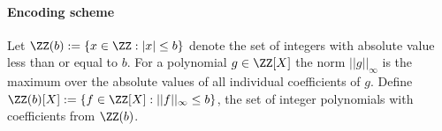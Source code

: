 \begin{comment}
Fortunately, from the value of $f'$ we can infer a \emph{probabilistic bound} on the absolute value of the $f_L$ and $f_R$ given that $\alpha \in (-p/2, p/2)$ is sampled randomly \emph{after} the prover has committed to $f_L$ and $f_R$. If $\alpha$ were not chosen randomly by the verifier no bound would apply: knowing $\alpha$, the prover can choose large $f_L$ and $f_R$ such that $\alpha f_L + f_R$ is small. The probabilistic bound is reasoned as follows: if $f'_0 \leftarrow \alpha_0 f_L + f_R$ and $f'_1 \leftarrow \alpha_1 f_L + f_R$ such that $max(|f'_0|, |f'_1|) < q / (2p)$ for some distinct $\alpha_0 \neq \alpha_1$, then $|f_L| \geq |f'_1 - f'_0| \leq q / p$ and $|f_R| \leq |\alpha_0 f'_1 - \alpha_1 f'_0| \leq q/2$. If no such pair exists, \emph{i.e.} the bound only holds for a unique $\alpha$, then there is a negligibly small probability $1/p$ that $f'$ would have passed the bound check. 
More generally, a bound on $||f'(X)||_\infty$ in some level of the recursion implies a probabilistic bound on $||f_L(X)||_\infty$ and $||f_R(X)||_\infty$ at the previous level. (For a polynomial $g \in \ZZ[X]$ the norm $||g||_\infty$ is the maximum over the absolute values of all individual coefficients of $g$).

This leads us to the following encoding scheme. We restrict the set of \emph{valid} encodings to be integers in the range $B = (-\frac{q^{d+1}}{2}, \frac{q^{d+1}}{2})$. An integer $z \in B$ is a valid encoding of $f \in \ZZ_p[X]$ if and only if there exists $\tilde{f} \equiv f \bmod p$ such that $||\tilde{f}||_\infty < q/2$ and $\hat{f}(q) = z$. Every $z \in B$ encodes a unique $f \in \FF_p[X]$ of degree at most $d$. (We prove this fact below). 
\end{comment} 

\paragraph{Encoding scheme} Let $\ZZ(b):=\{x \in \ZZ: \vert x \vert  \leq b\}$ denote the set of integers with absolute value less than or equal to $b$. For a polynomial $g \in \ZZ[X]$ the norm $||g||_\infty$ is the maximum over the absolute values of all individual coefficients of $g$. Define $\ZZ(b)[X] := \{f \in \ZZ[X]: ||f||_\infty \leq b\}$, the set of integer polynomials with coefficients from $\ZZ(b)$. 

